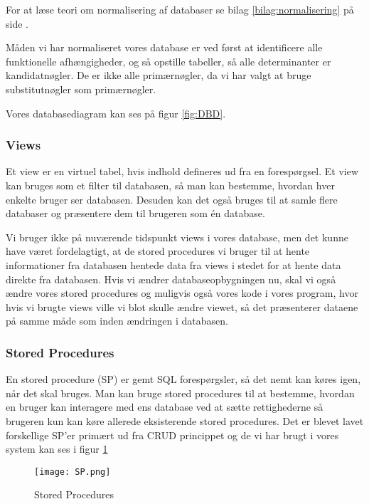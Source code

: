 For at læse teori om normalisering af databaser se bilag \ref{bilag:normalisering} på side \pageref{bilag:normalisering}. 

Måden vi har normaliseret vores database er ved først at identificere alle funktionelle afhængigheder, og så opstille tabeller, så alle determinanter er kandidatnøgler.
De er ikke alle primærnøgler, da vi har valgt at bruge substitutnøgler som primærnøgler.

Vores databasediagram kan ses på figur \ref{fig:DBD}.

\subsubsection{Views}

Et view er en virtuel tabel, hvis indhold defineres ud fra en forespørgsel.
Et view kan bruges som et filter til databasen, så man kan bestemme, hvordan hver enkelte bruger ser databasen.
Desuden kan det også bruges til at samle flere databaser og præsentere dem til brugeren som én database.

Vi bruger ikke på nuværende tidspunkt views i vores database, men det kunne have været fordelagtigt, at de stored procedures vi bruger til at hente informationer fra databasen hentede data fra views i stedet for at hente data direkte fra databasen.
Hvis vi ændrer databaseopbygningen nu, skal vi også ændre vores stored procedures og muligvis også vores kode i vores program, hvor hvis vi brugte views ville vi blot skulle ændre viewet, så det præsenterer dataene på samme måde som inden ændringen i databasen.

\subsubsection{Stored Procedures}
En stored procedure (SP) er gemt SQL forespørgsler, så det nemt kan køres igen, når det skal bruges.
Man kan bruge stored procedures til at bestemme, hvordan en bruger kan interagere med ens database ved at sætte rettighederne så brugeren kun kan køre allerede eksisterende stored procedures.
Det er blevet lavet forskellige SP'er primært ud fra CRUD princippet og de vi har brugt i vores system kan ses i figur \ref{StoredProcedures}

\begin{figure}[h]
    \caption{Stored Procedures}
    \centering
        \texttt{[image: SP.png]}
    \label{StoredProcedures}
\end{figure}

